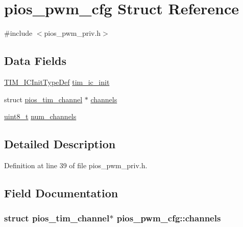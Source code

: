 \hypertarget{structpios__pwm__cfg}{\section{pios\-\_\-pwm\-\_\-cfg Struct Reference}
\label{structpios__pwm__cfg}
}


{\ttfamily \#include $<$pios\-\_\-pwm\-\_\-priv.\-h$>$}

\subsection*{Data Fields}
\begin{DoxyCompactItemize}
\item 
\hyperlink{struct_t_i_m___i_c_init_type_def}{T\-I\-M\-\_\-\-I\-C\-Init\-Type\-Def} \hyperlink{structpios__pwm__cfg_a7f64d325db8aca0d737d94648b079b36}{tim\-\_\-ic\-\_\-init}
\item 
struct \hyperlink{structpios__tim__channel}{pios\-\_\-tim\-\_\-channel} $\ast$ \hyperlink{structpios__pwm__cfg_a54b5c61baa9d577ea2344b3894d1687e}{channels}
\item 
\hyperlink{stdint_8h_aba7bc1797add20fe3efdf37ced1182c5}{uint8\-\_\-t} \hyperlink{structpios__pwm__cfg_acf9d41bfa9ce5ee489fcb27a98605e5c}{num\-\_\-channels}
\end{DoxyCompactItemize}


\subsection{Detailed Description}


Definition at line 39 of file pios\-\_\-pwm\-\_\-priv.\-h.



\subsection{Field Documentation}
\hypertarget{structpios__pwm__cfg_a54b5c61baa9d577ea2344b3894d1687e}{
\subsubsection[{channels}]{\setlength{\rightskip}{0pt plus 5cm}struct {\bf pios\-\_\-tim\-\_\-channel}$\ast$ pios\-\_\-pwm\-\_\-cfg\-::channels}}\label{structpios__pwm__cfg_a54b5c61baa9d577ea2344b3894d1687e}


